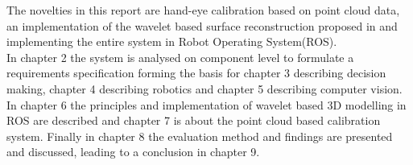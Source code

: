The novelties in this report are hand-eye calibration based on point cloud data, an implementation of the wavelet based surface reconstruction proposed in \cite{Someone wielding the wavelet hammer...} and implementing the entire system in Robot Operating System(ROS).\\

In chapter 2 the system is analysed on component level to formulate a requirements specification forming the basis for chapter 3 describing decision making, chapter 4 describing robotics and chapter 5 describing computer vision. In chapter 6 the principles and implementation of wavelet based 3D modelling in ROS are described and chapter 7 is about the point cloud based calibration system. Finally in chapter 8 the evaluation method and findings are presented and discussed, leading to a conclusion in chapter 9.